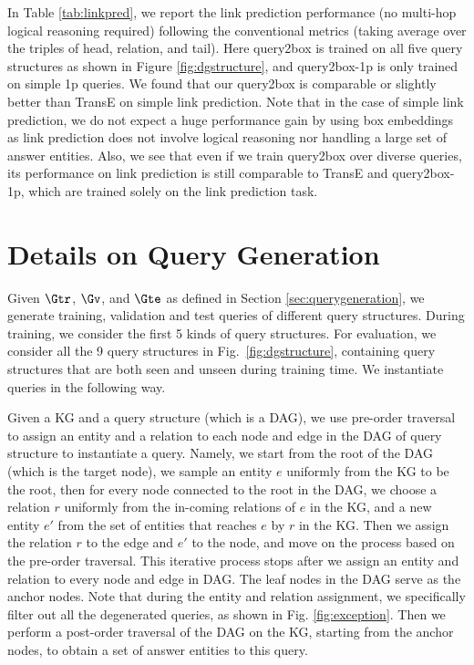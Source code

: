 In Table \ref{tab:linkpred}, we report the link prediction performance (no multi-hop logical reasoning required) following the conventional metrics (taking average over the triples of head, relation, and tail). Here query2box is trained on all five query structures as shown in Figure \ref{fig:dgstructure}, and query2box-1p is only trained on simple 1p queries. We found that our query2box is comparable or slightly better than TransE on simple link prediction. Note that in the case of simple link prediction, we do not expect a huge performance gain by using box embeddings as link prediction does not involve logical reasoning nor handling a large set of answer entities. Also, we see that even if we train query2box over diverse queries, its performance on link prediction is still comparable to TransE and query2box-1p, which are trained solely on the link prediction task.

\section{Details on Query Generation}
\label{app:pre-traversal}
Given $\Gtr$, $\Gv$, and $\Gte$ as defined in Section \ref{sec:querygeneration}, we generate training, validation and test queries of different query structures. During training, we consider the first 5 kinds of query structures. For evaluation, we consider all the 9 query structures in Fig.~\ref{fig:dgstructure}, containing query structures that are both seen and unseen during training time. We instantiate queries in the following way.

Given a KG and a query structure (which is a DAG), we use pre-order traversal to assign an entity and a relation to each node and edge in the DAG of query structure to instantiate a query. Namely, we start from the root of the DAG (which is the target node), we sample an entity $e$ uniformly from the KG to be the root, then for every node connected to the root in the DAG, we choose a relation $r$ uniformly from the in-coming relations of $e$ in the KG, and a new entity $e'$ from the set of entities that reaches $e$ by $r$ in the KG. Then we assign the relation $r$ to the edge and $e'$ to the node, and move on the process based on the pre-order traversal. This iterative process stops after we assign an entity and relation to every node and edge in DAG. The leaf nodes in the DAG serve as the anchor nodes. Note that during the entity and relation assignment, we specifically filter out all the degenerated queries, as shown in Fig. \ref{fig:exception}. Then we perform a post-order traversal of the DAG on the KG, starting from the anchor nodes, to obtain a set of answer entities to this query.

